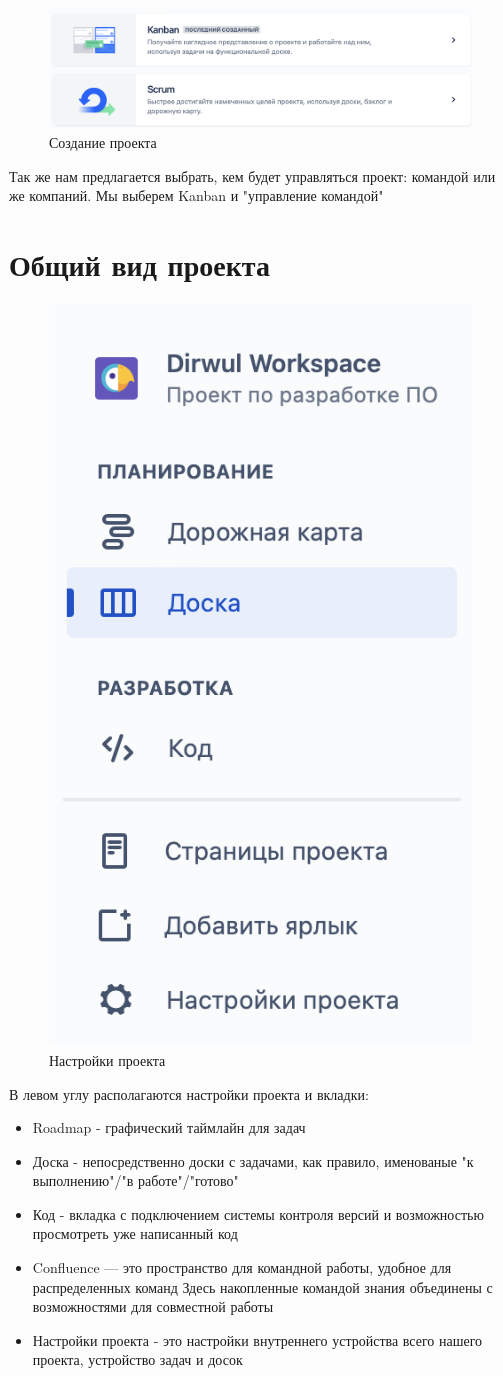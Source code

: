 \documentclass[12pt, a4paper]{article}
\begin{document}
    \begin{figure}[H]
        \centering
        \includegraphics[width=\linewidth]{src/scrumkanban.png}
        \caption{Создание проекта}
    \end{figure}

    Так же нам предлагается выбрать, кем будет управляться проект: командой или же компаний.
    Мы выберем Kanban и "управление командой"


    \newpage
    \section{Общий вид проекта}
    \begin{figure}[H]
        \centering
        \includegraphics[width=0.3\linewidth]{src/preferences.png}
        \caption{Настройки проекта}
    \end{figure}
    В левом углу располагаются настройки проекта и вкладки:
    \begin{itemize}
        \item Roadmap - графический таймлайн для задач 
        \item Доска - непосредственно доски с задачами, как правило, именованые "к выполнению"/"в работе"/"готово"
        \item Код - вкладка с подключением системы контроля версий и возможностью просмотреть уже написанный код 
        \item Confluence — это пространство для командной работы, удобное для распределенных команд 
        Здесь накопленные командой знания объединены с возможностями для совместной работы
        \item Настройки проекта - это настройки внутреннего устройства всего нашего проекта, устройство задач и досок
    \end{itemize}
\end{document}
